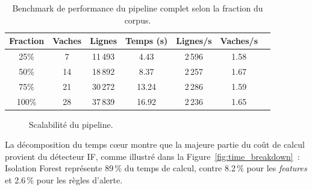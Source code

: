 \begin{table}[H]
    \centering
    \caption{Benchmark de performance du pipeline complet selon la fraction du corpus.}
    \label{tab:performance}
    \begin{tabular}{ccccccc}
        \toprule
        \textbf{Fraction} & \textbf{Vaches} & \textbf{Lignes} & \textbf{Temps (s)}
            & \textbf{Lignes/s} & \textbf{Vaches/s} \\
        \midrule
        25\% &  7 & 11\,493 &  4.43 & 2\,596 & 1.58 \\
        50\% & 14 & 18\,892 &  8.37 & 2\,257 & 1.67 \\
        75\% & 21 & 30\,272 & 13.24 & 2\,286 & 1.59 \\
        100\% & 28 & 37\,839 & 16.92 & 2\,236 & 1.65 \\
        \bottomrule
    \end{tabular}
\end{table}

\begin{figure}[H]
    \centering
    \caption{Scalabilité du pipeline.}
    \label{fig:scalability}
\end{figure}

\FloatBarrier

La décomposition du temps cœur montre que la majeure partie du coût de calcul provient du
détecteur IF, comme illustré dans la Figure~\ref{fig:time_breakdown}~: Isolation Forest
représente 89\,\% du temps de calcul, contre 8.2\,\% pour les \textit{features} et 2.6\,\% pour
les règles d'alerte.


